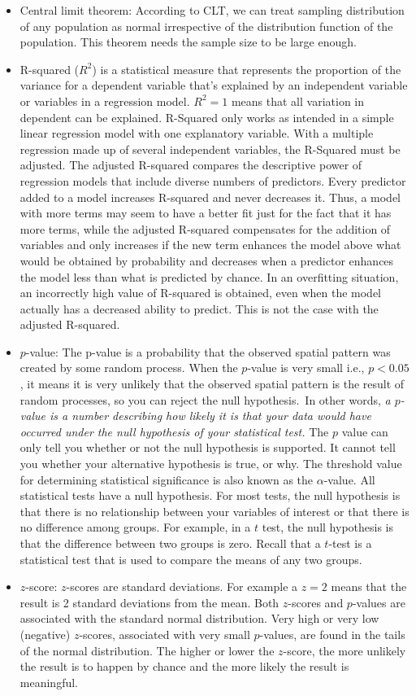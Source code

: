 \documentclass[11pt]{article}
\begin{document}
\begin{itemize}
\item Central limit theorem: According to CLT, we can treat sampling distribution of any population as normal irrespective of the distribution function of the 
population. This theorem needs the sample size to be large enough.
\item R-squared ($R^2$) is a statistical measure that represents the proportion of the variance for a dependent variable that's explained by an independent variable or variables in a regression model. $R^2 = 1$ means that all variation in dependent can be explained. R-Squared only works as intended in a simple linear regression model with one explanatory variable. With a multiple regression made up of several independent variables, the R-Squared must be adjusted.
The adjusted R-squared compares the descriptive power of regression models that include diverse numbers of predictors. Every predictor added to a model increases R-squared and never decreases it. Thus, a model with more terms may seem to have a better fit just for the fact that it has more terms, while the adjusted R-squared compensates for the addition of variables and only increases if the new term enhances the model above what would be obtained by probability and decreases when a predictor enhances the model less than what is predicted by chance. In an overfitting situation, 
an incorrectly high value of R-squared is obtained, even when the model actually has a decreased ability to predict. This is not the case with the adjusted R-squared.
\item $p$-value: The p-value is a probability that the observed spatial pattern was created by some random process. When the $p$-value is very small i.e., $ p < 0.05$, it means it is very unlikely that the observed spatial pattern is the result of random processes, so you can reject the null hypothesis.\
In other words, \emph{a $p$-value is a number describing how likely it is that your data would have occurred under the null hypothesis of your statistical test.}
The $p$ value can only tell you whether or not the null hypothesis is supported. It cannot tell you whether your alternative hypothesis is true, or why.
The threshold value for determining statistical significance is also known as the $\alpha$-value. All statistical tests have a null hypothesis. For most tests, the null hypothesis is that there is no relationship between your variables of interest or that there is no difference among groups. For example, in a $t$ test, the null hypothesis is that the difference between two groups is zero. Recall that a 
$t$-test is a statistical test that is used to compare the means of any two groups. 
\item $z$-score: $z$-scores are standard deviations. For example a $z=2$ means that the result is 2 standard deviations from the mean. 
Both $z$-scores and $p$-values are associated with the standard normal distribution. Very high or very low (negative) $z$-scores, 
associated with very small $p$-values, are found in the tails of the normal distribution. The higher or lower the $z$-score, the more unlikely the result is to happen by chance and the more likely the result is meaningful.
\end{itemize}  
\end{document}

